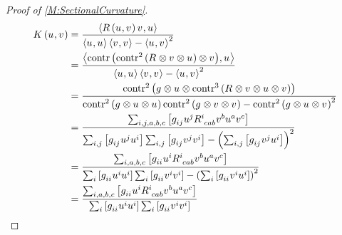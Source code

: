 \documentclass[../methodology.tex]{subfiles}
\begin{document}
\begin{proof}[Proof of \cref{M:SectionalCurvature}]
  \begin{align*}
    K\left(\tensor{u}{},\tensor{v}{}\right)
     & =
    \frac{
      \left\langle{R\left(\tensor{u}{},\tensor{v}{}\right)\tensor{v}{}},{\tensor{u}{}}\right\rangle
    }{
      \left\langle{\tensor{u}{}},{\tensor{u}{}}\right\rangle
      \left\langle{\tensor{v}{}},{\tensor{v}{}}\right\rangle
      -\left\langle{\tensor{u}{}},{\tensor{v}{}}\right\rangle^2
    }    \\
     & =
    \frac{
      \left\langle{
        \contr{\left(\contr^2{\left(\tensor{R}{}\otimes\tensor{v}{}\otimes\tensor{u}{}\right)}\otimes\tensor{v}{}\right)}
      },{\tensor{u}{}}\right\rangle
    }{
      \left\langle{\tensor{u}{}},{\tensor{u}{}}\right\rangle
      \left\langle{\tensor{v}{}},{\tensor{v}{}}\right\rangle
      -\left\langle{\tensor{u}{}},{\tensor{v}{}}\right\rangle^2
    }    \\
     & =
    \frac{
    \contr^2{\left(\tensor{g}{}\otimes\tensor{u}{}\otimes\contr^3\left(\tensor{R}{}\otimes\tensor{v}{}\otimes\tensor{u}{}\otimes\tensor{v}{}\right)\right)}
    }{
    \contr^2{\left(\tensor{g}{}\otimes\tensor{u}{}\otimes\tensor{u}{}\right)}
    \contr^2{\left(\tensor{g}{}\otimes\tensor{v}{}\otimes\tensor{v}{}\right)}
    -\contr^2{\left(\tensor{g}{}\otimes\tensor{u}{}\otimes\tensor{v}{}\right)}^2
    }    \\
     & =
    \frac{
      \sum_{i,j,a,b,c}\left[\tensor{g}{_i_j}\tensor{u}{^j}\tensor{R}{^i_c_a_b}\tensor{v}{^b}\tensor{u}{^a}\tensor{v}{^c}\right]
    }{
      \sum_{i,j}\left[\tensor{g}{_i_j}\tensor{u}{^j}\tensor{u}{^i}\right]
      \sum_{i,j}\left[\tensor{g}{_i_j}\tensor{v}{^j}\tensor{v}{^i}\right]
      -\left(\sum_{i,j}\left[\tensor{g}{_i_j}\tensor{v}{^j}\tensor{u}{^i}\right]\right)^2
    }    \\
     & =
    \frac{
      \sum_{i,a,b,c}\left[\tensor{g}{_i_i}\tensor{u}{^i}\tensor{R}{^i_c_a_b}\tensor{v}{^b}\tensor{u}{^a}\tensor{v}{^c}\right]
    }{
      \sum_{i}\left[\tensor{g}{_i_i}\tensor{u}{^i}\tensor{u}{^i}\right]
      \sum_{i}\left[\tensor{g}{_i_i}\tensor{v}{^i}\tensor{v}{^i}\right]
      -\left(\sum_{i}\left[\tensor{g}{_i_i}\tensor{v}{^i}\tensor{u}{^i}\right]\right)^2
    }    \\
     & =
    \frac{
      \sum_{i,a,b,c}\left[\tensor{g}{_i_i}\tensor{u}{^i}\tensor{R}{^i_c_a_b}\tensor{v}{^b}\tensor{u}{^a}\tensor{v}{^c}\right]
    }{
      \sum_{i}\left[\tensor{g}{_i_i}\tensor{u}{^i}\tensor{u}{^i}\right]
      \sum_{i}\left[\tensor{g}{_i_i}\tensor{v}{^i}\tensor{v}{^i}\right]
}
\end{align*}
\end{proof}
\end{document}
